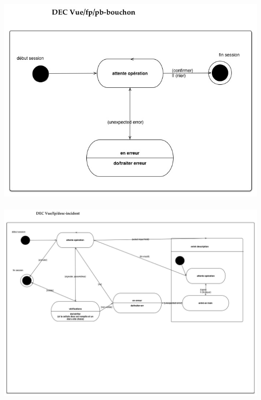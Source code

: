 \documentclass{report}
\begin{document}
\paragraph{}

\includegraphics[scale = 0.75]{images/dec-livreur-bouchon.jpg}

\paragraph{}

\includegraphics[scale = 0.5, angle = 90]{images/dec-livreur-incident.jpg}

\paragraph{}
\end{document}
